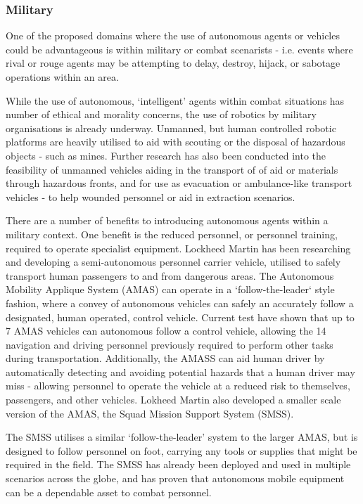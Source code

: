 \subsubsection{Military}
One of the proposed domains where the use of autonomous agents or vehicles
could be advantageous is within military or combat scenarists - i.e. events
where rival or rouge agents may be attempting to delay, destroy, hijack, or
sabotage operations within an area.

While the use of autonomous, `intelligent' agents within combat situations
has number of ethical and morality concerns, the use of robotics by military
organisations is already underway.
Unmanned, but human controlled robotic platforms are heavily utilised to aid
with scouting or the disposal of hazardous objects - such as mines.
Further research has also been conducted into the feasibility of unmanned
vehicles aiding in the transport of of aid or materials through hazardous
fronts, and for use as evacuation or ambulance-like transport vehicles - to
help wounded personnel or aid in extraction scenarios.

There are a number of benefits to introducing autonomous agents within a military context.
One benefit is the reduced personnel, or personnel training, required to
operate specialist equipment.  
Lockheed Martin has been researching and developing a semi-autonomous
personnel carrier vehicle, utilised to safely transport human passengers to
and from dangerous areas.
The Autonomous Mobility Applique System (AMAS) can operate in a
`follow-the-leader` style fashion, where a convey of autonomous vehicles can
safely an accurately follow a designated, human operated, control vehicle.
Current test have shown that up to 7 AMAS vehicles can autonomous follow a
control vehicle, allowing the 14 navigation and driving personnel previously
required to perform other tasks during transportation.
Additionally, the AMASS can aid human driver by automatically detecting and
avoiding potential hazards that a human driver may miss - allowing personnel to operate
the vehicle at a reduced risk to themselves, passengers, and other vehicles.
Lokheed Martin also developed a smaller scale version of the AMAS, the Squad Mission
Support System (SMSS).

The SMSS utilises a similar `follow-the-leader' system to the larger AMAS, but
is designed to follow personnel on foot, carrying any tools or supplies that
might be required in the field.
The SMSS has already been deployed and used in multiple scenarios across the
globe, and has proven that autonomous mobile equipment can be a dependable
asset to combat personnel.


